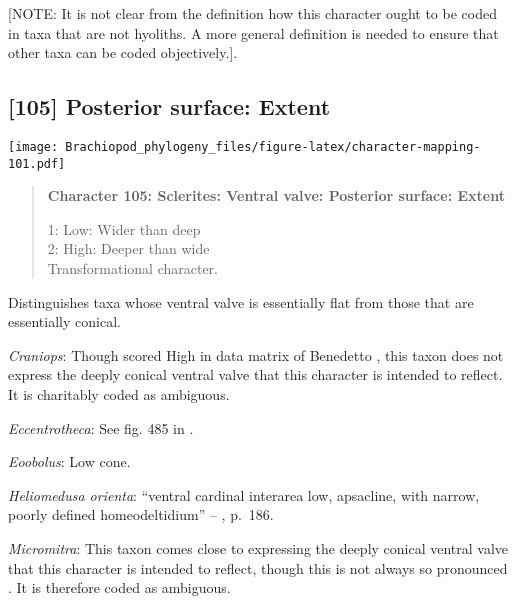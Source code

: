 \documentclass[openany]{book}
\theoremstyle{definition}
\theoremstyle{definition}
\theoremstyle{definition}
\theoremstyle{remark}
\begin{document}
{[}NOTE: It is not clear from the definition how this character ought to
be coded in taxa that are not hyoliths. A more general definition is
needed to ensure that other taxa can be coded objectively.{]}.

\subsection*{{[}105{]} Posterior surface:
Extent}\label{posterior-surface-extent}

\texttt{[image: Brachiopod\_phylogeny\_files/figure-latex/character-mapping-101.pdf]}

\begin{quote}
\textbf{Character 105: Sclerites: Ventral valve: Posterior surface:
Extent}

1: Low: Wider than deep\\
2: High: Deeper than wide\\
Transformational character.
\end{quote}

Distinguishes taxa whose ventral valve is essentially flat from those
that are essentially conical.

\hypertarget{Craniops-coding-105}{}
\emph{Craniops}: Though scored High in data matrix of Benedetto
\citeyearpar{Benedetto2009iChaniella}, this taxon \citep[see][fig.
508]{Williams2000LinguliformeaCraniiformea} does not express the deeply
conical ventral valve that this character is intended to reflect. It is
charitably coded as ambiguous.

\hypertarget{Eccentrotheca-coding-105}{}
\emph{Eccentrotheca}: See fig. 485 in
\citet{Williams2000LinguliformeaCraniiformea}.

\hypertarget{Eoobolus-coding-105}{}
\emph{Eoobolus}: Low cone.

\hypertarget{Heliomedusa_orienta-coding-105}{}
\emph{Heliomedusa orienta}: ``ventral cardinal interarea low, apsacline,
with narrow, poorly defined homeodeltidium'' --
\citet{Williams2000LinguliformeaCraniiformea}, p.~186.

\hypertarget{Micromitra-coding-105}{}
\emph{Micromitra}: This taxon \citetext{\citealp[see][fig.
129]{Williams2000LinguliformeaCraniiformea}; \citealp[fig.
1]{Popov1992TheCambrian}} comes close to expressing the deeply conical
ventral valve that this character is intended to reflect, though this is
not always so pronounced \citep[e.g.][fig.
125]{Williams2000LinguliformeaCraniiformea}. It is therefore coded as
ambiguous.
\end{document}

